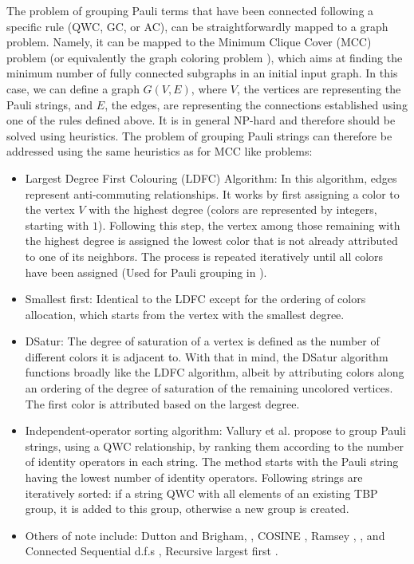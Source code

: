 The problem of grouping Pauli terms that have been connected following a specific rule (QWC, GC, or AC), can be straightforwardly mapped to a graph problem. Namely, it can be mapped to the Minimum Clique Cover (MCC) problem \cite{Hamamura2020, Jena2019, Crawford2021, Verteletskyi2020, Izmaylov2020a, Zhao2020, Yen2020} (or equivalently the graph coloring problem \cite{Garey1979}), which aims at finding the minimum number of fully connected subgraphs in an initial input graph. In this case, we can define a graph $G( V, E)$, where $V$, the vertices are representing the Pauli strings, and $E$, the edges, are representing the connections established using one of the rules defined above. It is in general NP-hard \cite{Karp1972} and therefore should be solved using heuristics. The problem of grouping Pauli strings can therefore be addressed using the same heuristics as for MCC like problems: 

\begin{itemize}
    \item Largest Degree First Colouring (LDFC) Algorithm: In this algorithm, edges represent anti-commuting relationships. It works by first assigning a color to the vertex $V$ with the highest degree (colors are represented by integers, starting with $1$). Following this step, the vertex among those remaining with the highest degree is assigned the lowest color that is not already attributed to one of its neighbors. The process is repeated iteratively until all colors have been assigned \cite{Welsh1967} (Used for Pauli grouping in \cite{Hamamura2020}).
    \item Smallest first: Identical to the LDFC except for the ordering of colors allocation, which starts from the vertex with the smallest degree.  \cite{Matula1972}
    \item DSatur: The degree of saturation of a vertex is defined as the number of different colors it is adjacent to. With that in mind, the DSatur algorithm functions broadly like the LDFC algorithm, albeit by attributing colors along an ordering of the degree of saturation of the remaining uncolored vertices. The first color is attributed based on the largest degree. \cite{Brelaz1979}
    \item Independent-operator sorting algorithm: Vallury et al. \cite{Vallury2020} propose to group Pauli strings, using a QWC relationship, by ranking them according to the number of identity operators in each string. The method starts with the Pauli string having the lowest number of identity operators. Following strings are iteratively sorted: if a string QWC with all elements of an existing TBP group, it is added to this group, otherwise a new group is created. 
    \item Others of note include: Dutton and Brigham, \cite{Dutton1981}, COSINE \cite{Hertz1990}, Ramsey \cite{Boppana1992}, \cite{Tomita2006}, and Connected Sequential d.f.s \cite{Kubale2004}, Recursive largest first \cite{Leighton1979}.
\end{itemize}

